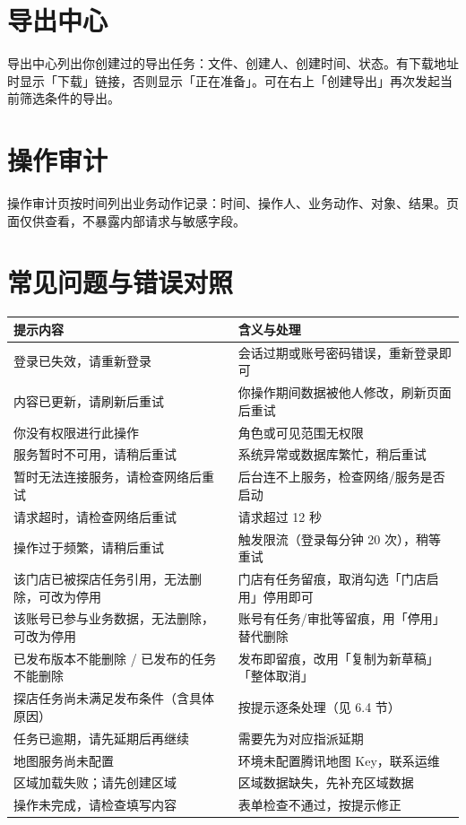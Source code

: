 \documentclass[12pt,a4paper,fontset=none]{ctexart}
\begin{document}
\section{导出中心}

导出中心列出你创建过的导出任务：文件、创建人、创建时间、状态。有下载地址时显示「下载」链接，否则显示「正在准备」。可在右上「创建导出」再次发起当前筛选条件的导出。

\section{操作审计}

操作审计页按时间列出业务动作记录：时间、操作人、业务动作、对象、结果。页面仅供查看，不暴露内部请求与敏感字段。

\section{常见问题与错误对照}

\begin{center}
\begin{tabular}{p{5.2cm}p{8cm}}
\toprule
提示内容 & 含义与处理 \\
\midrule
登录已失效，请重新登录 & 会话过期或账号密码错误，重新登录即可 \\
内容已更新，请刷新后重试 & 你操作期间数据被他人修改，刷新页面后重试 \\
你没有权限进行此操作 & 角色或可见范围无权限 \\
服务暂时不可用，请稍后重试 & 系统异常或数据库繁忙，稍后重试 \\
暂时无法连接服务，请检查网络后重试 & 后台连不上服务，检查网络/服务是否启动 \\
请求超时，请检查网络后重试 & 请求超过 12 秒 \\
操作过于频繁，请稍后重试 & 触发限流（登录每分钟 20 次），稍等重试 \\
该门店已被探店任务引用，无法删除，可改为停用 & 门店有任务留痕，取消勾选「门店启用」停用即可 \\
该账号已参与业务数据，无法删除，可改为停用 & 账号有任务/审批等留痕，用「停用」替代删除 \\
已发布版本不能删除 / 已发布的任务不能删除 & 发布即留痕，改用「复制为新草稿」「整体取消」 \\
探店任务尚未满足发布条件（含具体原因） & 按提示逐条处理（见 6.4 节） \\
任务已逾期，请先延期后再继续 & 需要先为对应指派延期 \\
地图服务尚未配置 & 环境未配置腾讯地图 Key，联系运维 \\
区域加载失败；请先创建区域 & 区域数据缺失，先补充区域数据 \\
操作未完成，请检查填写内容 & 表单检查不通过，按提示修正 \\
\bottomrule
\end{tabular}
\end{center}
\end{document}
